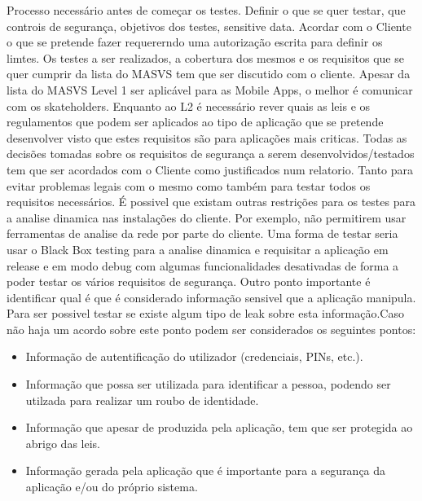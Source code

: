 	Processo necessário antes de começar os testes. Definir o que se quer testar, que controis de segurança, objetivos dos testes, sensitive data. Acordar com o Cliente o que se pretende fazer requererndo uma autorização escrita para definir os limtes. Os testes a ser realizados, a cobertura dos mesmos e os requisitos que se quer cumprir da lista do MASVS tem que ser discutido com o cliente. Apesar da lista do MASVS Level 1 ser aplicável para as Mobile Apps, o melhor é comunicar com os skateholders. Enquanto ao L2 é necessário rever quais as leis e os regulamentos que podem ser aplicados ao tipo de aplicação que se pretende desenvolver visto que estes requisitos são para aplicações mais criticas.
	Todas as decisões tomadas sobre os requisitos de segurança a serem desenvolvidos/testados tem que ser acordados com o Cliente como justificados num relatorio. Tanto para evitar problemas legais com o mesmo como também para testar todos os requisitos necessários.
	É possivel que existam outras restrições para os testes para a analise dinamica nas instalações do cliente. Por exemplo, não permitirem usar ferramentas de analise da rede por parte do cliente. Uma forma de testar seria usar o Black Box testing para a analise dinamica e requisitar a aplicação em release e em modo debug com algumas funcionalidades desativadas de forma a poder testar os vários requisitos de segurança.
	Outro ponto importante é identificar qual é que é considerado informação sensivel que a aplicação manipula. Para ser possivel testar se existe algum tipo de leak sobre esta informação.Caso não haja um acordo sobre este ponto podem ser considerados os seguintes pontos:

\begin{itemize}

\item Informação de autentificação do utilizador (credenciais, PINs, etc.).

\item Informação que possa ser utilizada para identificar a pessoa, podendo ser utilzada para realizar um roubo de identidade.

\item Informação que apesar de produzida pela aplicação, tem que ser protegida ao abrigo das leis.

\item Informação gerada pela aplicação que é importante para a segurança da aplicação e/ou do próprio sistema.

\end{itemize}

